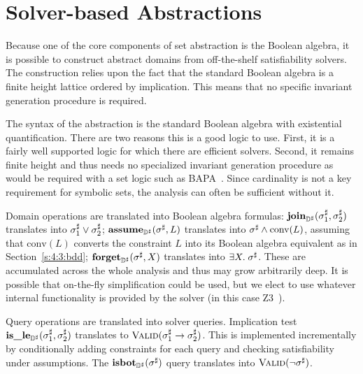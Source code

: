 \section{Solver-based Abstractions}
\label{sec:solvers}

Because one of the core components of set abstraction is the Boolean algebra, it is possible to construct abstract domains from off-the-shelf satisfiability solvers.  The construction relies upon the fact that the standard Boolean algebra is a finite height lattice ordered by implication.  This means that no specific invariant generation procedure is required.

The syntax of the abstraction is the standard Boolean algebra with existential quantification.  There are two reasons this is a good logic to use.  First, it is a fairly well supported logic for which there are efficient solvers.  Second, it remains finite height and thus needs no specialized invariant generation procedure as would be required with a set logic such as BAPA~\cite{knr:jar:06}.  Since cardinality is not a key requirement for symbolic sets, the analysis can often be sufficient without it.

Domain operations are translated into Boolean algebra formulas:
$\textbf{join}_{{\mathbb{D}}^{\sharp}}({\sigma}^{\sharp}_1,{\sigma}^{\sharp}_2)$ translates into ${\sigma}^{\sharp}_1 \vee {\sigma}^{\sharp}_2$;
$\textbf{assume}_{{\mathbb{D}}^{\sharp}}({\sigma}^{\sharp}, L)$ translates into ${\sigma}^{\sharp} \wedge \textrm{conv}(L)$,
assuming that $\textrm{conv}(L)$ converts the constraint $L$ into its Boolean
algebra equivalent as in Section~\ref{s:4:3:bdd};
$\textbf{forget}_{{\mathbb{D}}^{\sharp}}({\sigma}^{\sharp}, X)$ translates into $\exists X. \; {\sigma}^{\sharp}$.
These are accumulated across the whole analysis and thus may grow
arbitrarily deep.
It is possible that on-the-fly simplification could be used, but we elect
to use whatever internal functionality is provided by the solver (in this
case Z3~\cite{mb:tacas:08}).

Query operations are translated into solver queries.
Implication test $\textbf{is\_le}_{{\mathbb{D}}^{\sharp}}({\sigma}^{\sharp}_1, {\sigma}^{\sharp}_2)$ translates to
$\textsc{Valid}({\sigma}^{\sharp}_1 \rightarrow {\sigma}^{\sharp}_2)$.
This is implemented incrementally by conditionally adding constraints
for each query and checking satisfiability under assumptions.
The $\textbf{isbot}_{{\mathbb{D}}^{\sharp}}({\sigma}^{\sharp})$ query translates into $\textsc{Valid}(\neg {\sigma}^{\sharp})$.

